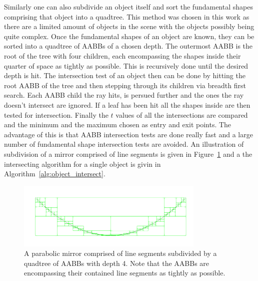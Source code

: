 \documentclass[a4paper,10pt]{article}
\newcommand{\figref}[1]{Figure~\ref{#1}}
\newcommand{\algref}[1]{Algorithm~\ref{#1}}
\begin{document}
    Similarly one can also subdivide an object itself and sort the
    fundamental shapes comprising that object into a quadtree.
    This method was chosen in this work as there are a limited amount of
    objects in the scene with the objects possibly being quite complex.
    Once the fundamental shapes of an object are known, they can be
    sorted into a quadtree of AABBs of a chosen depth.
    The outermost AABB is the root of the tree with four children,
    each encompassing the shapes inside their quarter of space
    as tightly as possible.
    This is recursively done until the desired depth is hit.
    The intersection test of an object then can be done by hitting
    the root AABB of the tree and then stepping through its children
    via breadth first search.
    Each AABB child the ray hits, is persued further and the ones
    the ray doesn't intersect are ignored.
    If a leaf has been hit all the shapes inside are then tested for
    intersection.
    Finally the $t$ values of all the intersections are compared and
    the minimum and the maximum chosen as entry and exit points. 
    The advantage of this is that AABB intersection tests are done really
    fast and a large number of fundamental shape intersection tests
    are avoided.
    An illustration of subdivision of a mirror comprised of line segments
    is given in \figref{fig:quadtree} and a the intersecting algorithm
    for a single object is givin in \algref{alg:object_intersect}.

    \begin{center}
        \begin{figure}
            \centering    
            \includegraphics[width=0.8\textwidth]{images/mirror.png}
            \caption{
                A parabolic mirror comprised of line segments
                subdivided by a quadtree of AABBs with depth 4.
                Note that the AABBs are encompassing their contained line
                segments as tightly as possible.
            }
            \label{fig:quadtree}
        \end{figure}
    \end{center}
\end{document}
